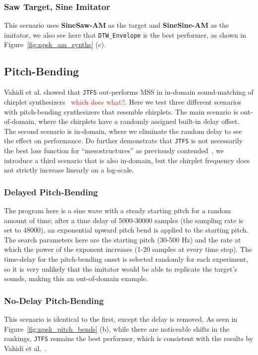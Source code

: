 \documentclass{article} %
\newcommand{\todo}[1]{\textcolor{red}{#1}}
\newcommand{\JTFS}{\texttt{JTFS}\xspace}
\newcommand{\DTWEnv}{\texttt{DTW\_Envelope}\xspace}
\newcommand{\FMMod}{\textbf{SineSaw-AM}\xspace}
\newcommand{\FMModvtwo}{\textbf{SineSine-AM}\xspace}
\begin{document}
\subsubsection{Saw Target, Sine Imitator}
\label{sec:am_sawtarget_sineimitate}
This scenario uses \FMMod as the target and \FMModvtwo as the imitator, we also see here that \DTWEnv is the best performer, as shown in Figure~\ref{fig:npsk_am_synths} (c).





\subsection{Pitch-Bending}
Vahidi et al. showed that \JTFS out-performs MSS in in-domain sound-matching of chirplet synthesizers~\cite{vahidi2023mesostructures} \todo{which does what?}. Here we test three different scenarios with pitch-bending synthesizers that resemble chirplets. The main scenario is out-of-domain, where the chirplets have a randomly assigned built-in delay offset. The second scenario is in-domain, where we eliminate the random delay to see the effect on performance. Do further demonstrate that \JTFS is not necessarily the best loss function for ``mesostructures'' as previously contended~\cite{vahidi2023mesostructures}, we introduce a third scenario that is also in-domain, but the chirplet frequency does not strictly increase linearly on a log-scale.


\subsubsection{Delayed Pitch-Bending}
The program here is a sine wave with a steady starting pitch for a random amount of time; after a time delay of 5000-30000 samples (the sampling rate is set to 48000), an exponential upward pitch bend is applied to the starting pitch. The search parameters here are the starting pitch (30-500 Hz) and the rate at which the power of the exponent increases (1-20 samples at every time step). The time-delay for the pitch-bending onset is selected randomly for each experiment, so it is very unlikely that the imitator would be able to replicate the target's sounds, making this an out-of-domain example.

\subsubsection{No-Delay Pitch-Bending}
This scenario is identical to the first, except the delay is removed. As seen in Figure~\ref{fig:npsk_pitch_bends} (b), while there are noticeable shifts in the rankings, \JTFS remains the best performer, which is consistent with the results by Vahidi et al.~\cite{vahidi2023mesostructures}.
\end{document}
